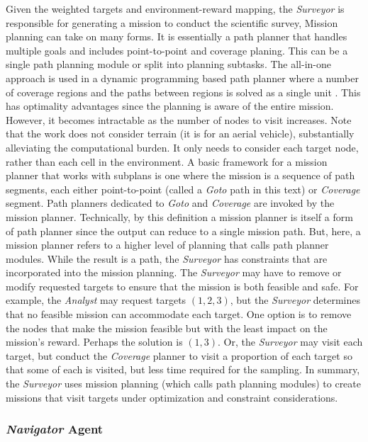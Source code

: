 \documentclass{tamuccthesis}
\begin{document}
Given the weighted targets and environment-reward mapping, the \textit{Surveyor} is responsible for generating a mission to conduct the scientific survey, Mission planning can take on many forms. It is essentially a path planner that handles multiple goals and includes point-to-point and coverage planing. This can be a single path planning module or split into planning subtasks. The all-in-one approach is used in a dynamic programming based path planner where a number of coverage regions and the paths between regions is solved as a single unit \cite{garcia:planner}. This has optimality advantages since the planning is aware of the entire mission. However, it becomes intractable as the number of nodes to visit increases. Note that the work does not consider terrain (it is for an aerial vehicle), substantially alleviating the computational burden. It only needs to consider each target node, rather than each cell in the environment. A basic framework for a mission planner that works with subplans is one where the mission is a sequence of path segments, each either point-to-point (called a \textit{Goto} path in this text) or \textit{Coverage} segment. Path planners dedicated to \textit{Goto} and \textit{Coverage} are invoked by the mission planner. Technically, by this definition a mission planner is itself a form of path planner since the output can reduce to a single mission path. But, here, a mission planner refers to a higher level of planning that calls path planner modules. While the result is a path, the \textit{Surveyor} has constraints that are incorporated into the mission planning. The \textit{Surveyor} may have to remove or modify requested targets to ensure that the mission is both feasible and safe. For example, the \textit{Analyst} may request targets $(1, 2, 3)$, but the \textit{Surveyor} determines that no feasible mission can accommodate each target. One option is to remove the nodes that make the mission feasible but with the least impact on the mission's reward. Perhaps the solution is $(1, 3)$. Or, the \textit{Surveyor} may visit each target, but conduct the \textit{Coverage} planner to visit a proportion of each target so that some of each is visited, but less time required for the sampling. In summary, the \textit{Surveyor} uses mission planning (which calls path planning modules) to create missions that visit targets under optimization and constraint considerations. 

\subsubsection{\textit{Navigator} Agent}
\end{document}
